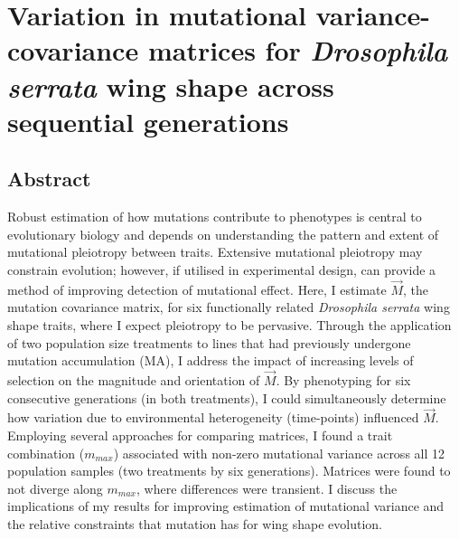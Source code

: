 
\chapter{Variation in mutational variance-covariance matrices for \textit{Drosophila serrata} wing shape across sequential generations}
\vspace{2cm}

\section{Abstract}
Robust estimation of how mutations contribute to phenotypes is central to evolutionary biology and depends on understanding the pattern and extent of mutational pleiotropy between traits. Extensive mutational pleiotropy may constrain evolution; however, if utilised in experimental design, can provide a method of improving detection of mutational effect.  Here, I estimate $\vec{M}$, the mutation covariance matrix, for six functionally related \textit{Drosophila serrata} wing shape traits, where I expect pleiotropy to be pervasive. Through the application of two population size treatments to lines that had previously undergone mutation accumulation (MA), I address the impact of increasing levels of selection on the magnitude and orientation of $\vec{M}$. By phenotyping for six consecutive generations (in both treatments), I could simultaneously determine how variation due to environmental heterogeneity (time-points) influenced $\vec{M}$. Employing several approaches for comparing matrices, I found a trait combination ($m_{max}$) associated with non-zero mutational variance across all 12 population samples (two treatments by six generations). Matrices were found to not diverge along $m_{max}$, where differences were transient. I discuss the implications of my results for improving estimation of mutational variance and the relative constraints that mutation has for wing shape evolution. \par

\newpage

